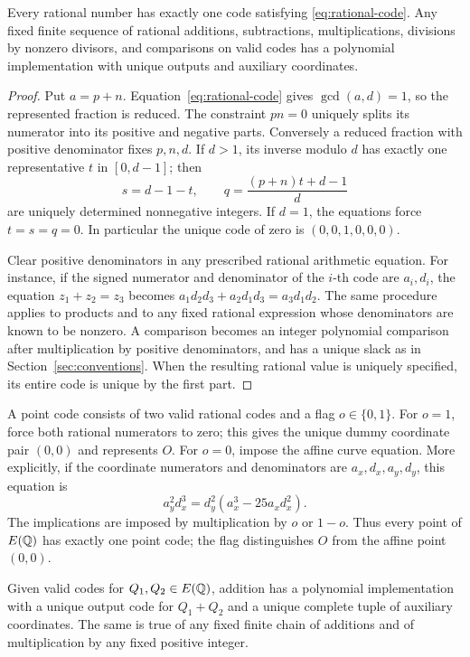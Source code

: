 \begin{lemma}\label{lem:rational-codes}
Every rational number has exactly one code satisfying
\eqref{eq:rational-code}.  Any fixed finite sequence of rational
additions, subtractions, multiplications, divisions by nonzero divisors,
and comparisons on valid codes has a polynomial implementation with
unique outputs and auxiliary coordinates.
\end{lemma}

\begin{proof}
Put \(a=p+n\).  Equation~\eqref{eq:rational-code} gives
\(\gcd(a,d)=1\), so the represented fraction is reduced.
The constraint \(pn=0\) uniquely splits its numerator into its
positive and negative parts.  Conversely a reduced fraction with
positive denominator fixes \(p,n,d\).  If \(d>1\), its inverse
modulo \(d\) has exactly one representative \(t\) in
\([0,d-1]\); then
\[
 s=d-1-t,\qquad q=\frac{(p+n)t+d-1}{d}
\]
are uniquely determined nonnegative integers.  If \(d=1\), the
equations force \(t=s=q=0\).  In particular the unique code of
zero is \((0,0,1,0,0,0)\).

Clear positive denominators in any prescribed rational arithmetic
equation.  For instance, if the signed numerator and denominator of
the \(i\)-th code are \(a_i,d_i\), the equation
\(z_1+z_2=z_3\) becomes
\(a_1d_2d_3+a_2d_1d_3=a_3d_1d_2\).
The same procedure applies to products and to any fixed rational
expression whose denominators are known to be nonzero.  A comparison
becomes an integer polynomial comparison after multiplication by
positive denominators, and has a unique slack as in
Section~\ref{sec:conventions}.  When the resulting rational value
is uniquely specified, its entire code is unique by the first part.
\end{proof}

A point code consists of two valid rational codes and a flag
\(o\in\{0,1\}\).  For \(o=1\), force both rational numerators
to zero; this gives the unique dummy coordinate pair \((0,0)\)
and represents \(O\).  For \(o=0\), impose the affine curve
equation.  More explicitly, if the coordinate numerators and
denominators are \(a_x,d_x,a_y,d_y\), this equation is
\[
 a_y^2d_x^3=d_y^2(a_x^3-25a_xd_x^2).
\]
The implications are imposed by multiplication by \(o\) or
\(1-o\).  Thus every point of \(E(\mathbb Q)\) has exactly one
point code; the flag distinguishes \(O\) from the affine point
\((0,0)\).

\begin{lemma}\label{lem:point-arithmetic}
Given valid codes for \(Q_1,Q_2\in E(\mathbb Q)\), addition has a
polynomial implementation with a unique output code for \(Q_1+Q_2\)
and a unique complete tuple of auxiliary coordinates.  The same is
true of any fixed finite chain of additions and of multiplication by
any fixed positive integer.
\end{lemma}

